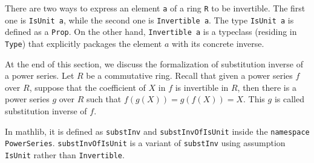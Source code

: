 There are two ways to express an element \lstinline|a| of a ring \lstinline|R| to
be invertible. The first one is \lstinline|IsUnit a|, while the second one
is \lstinline|Invertible a|. The type \lstinline|IsUnit a| is defined as a \lstinline|Prop|.
On the other hand, \lstinline|Invertible a| is a typeclass (residing in \lstinline|Type|)
that explicitly packages the element $a$ with its concrete inverse.

At the end of this section, we discuss the formalization of
substitution inverse of a power series. Let $R$ be a commutative ring.
Recall that given a power series $f$ over $R$, suppose that
the coefficient of $X$ in $f$ is invertible in $R$, then there is a
power series $g$ over $R$ such that $f(g(X)) = g(f(X)) = X$. This
$g$ is called substitution inverse of $f$.

In mathlib, it is defined as \lstinline|substInv|
\href{https://leanprover-community.github.io/mathlib4_docs/Mathlib/RingTheory/PowerSeries/Substitution.html#PowerSeries.substInv}{\faExternalLink}
and
\lstinline|substInvOfIsUnit|
\href{https://leanprover-community.github.io/mathlib4_docs/Mathlib/RingTheory/PowerSeries/Substitution.html#PowerSeries.substInvOfIsUnit}{\faExternalLink}
inside the \lstinline|namespace PowerSeries|.
\lstinline|substInvOfIsUnit| is a variant of \lstinline|substInv| using
assumption \lstinline|IsUnit| rather than \lstinline|Invertible|.









